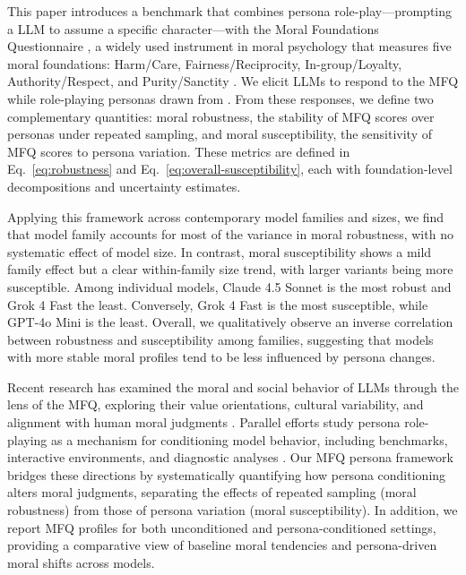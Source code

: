 \documentclass{article}
\begin{document}
This paper introduces a benchmark that combines persona role-play---prompting a LLM to assume a specific character---with the Moral Foundations Questionnaire \citep{moralfoundations2017questionnaires}, a widely used instrument in moral psychology that measures five moral foundations: Harm/Care, Fairness/Reciprocity, In-group/Loyalty, Authority/Respect, and Purity/Sanctity \citep{graham2009liberals,haidt2007when,moralfoundations2017questionnaires}. We elicit LLMs to respond to the MFQ while role-playing personas drawn from \citet{ge2025scalingsyntheticdatacreation}. From these responses, we define two complementary quantities: moral robustness, the stability of MFQ scores over personas under repeated sampling, and moral susceptibility, the sensitivity of MFQ scores to persona variation. These metrics are defined in Eq.~\eqref{eq:robustness} and Eq.~\eqref{eq:overall-susceptibility}, each with foundation-level decompositions and uncertainty estimates.

Applying this framework across contemporary model families and sizes, we find that model family accounts for most of the variance in moral robustness, with no systematic effect of model size. In contrast, moral susceptibility shows a mild family effect but a clear within-family size trend, with larger variants being more susceptible. Among individual models, Claude 4.5 Sonnet is the most robust and Grok 4 Fast the least. Conversely, Grok 4 Fast is the most susceptible, while GPT-4o Mini is the least. Overall, we qualitatively observe an inverse correlation between robustness and susceptibility among families, suggesting that models with more stable moral profiles tend to be less influenced by persona changes.

Recent research has examined the moral and social behavior of LLMs through the lens of the MFQ, exploring their value orientations, cultural variability, and alignment with human moral judgments \citep{abdulhai-etal-2024-moral,nunes2024hypocrites,aksoy2024whose,bajpai2024insights,ji2025moralbenchmoralevaluationllms}. Parallel efforts study persona role-playing as a mechanism for conditioning model behavior, including benchmarks, interactive environments, and diagnostic analyses \citep{tseng2024two,wang2023rolellm,samuel2025personagym,yu2025rpgbench,xu2024character,elboudouri2025rpeval,bai2025concept}. Our MFQ persona framework bridges these directions by systematically quantifying how persona conditioning alters moral judgments, separating the effects of repeated sampling (moral robustness) from those of persona variation (moral susceptibility). In addition, we report MFQ profiles for both unconditioned and persona-conditioned settings, providing a comparative view of baseline moral tendencies and persona-driven moral shifts across models.
\end{document}
